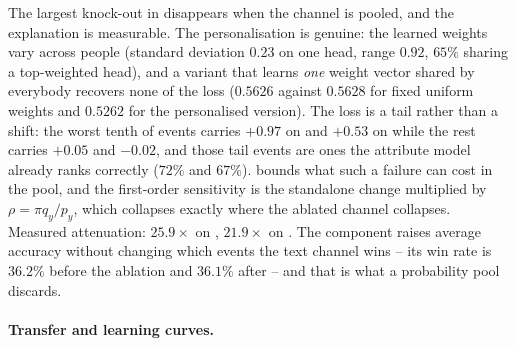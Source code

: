 The largest knock-out in  disappears when the channel is pooled, and the
explanation is measurable. The personalisation is genuine: the learned weights vary across
people (standard deviation $0.23$ on one head, range $0.92$, $65\%$ sharing a top-weighted
head), and a variant that learns \emph{one} weight vector shared by everybody recovers none of
the loss ($0.5626$ against $0.5628$ for fixed uniform weights and $0.5262$ for the personalised
version). The loss is a tail rather than a shift: the worst tenth of events carries $+0.97$ on
 and $+0.53$ on  while the rest carries $+0.05$ and $-0.02$, and
those tail events are ones the attribute model already ranks correctly ($72\%$ and $67\%$).
 bounds what such a failure can cost in the pool, and the first-order sensitivity
is the standalone change multiplied by $\rho = \pi q_y/p_y$, which collapses exactly where the
ablated channel collapses. Measured attenuation: $25.9\times$ on ,
$21.9\times$ on . The component raises average accuracy without changing which
events the text channel wins -- its win rate is $36.2\%$ before the ablation and $36.1\%$ after
-- and that is what a probability pool discards.


\begin{table}[h]
\caption{Fitted mixture weight $\pi$ by channel, respondent-disjoint protocol. A channel with no
text at all attracts the largest weight on every dataset.}
\label{tab:pi}
\centering\small

\end{table}

\begin{table}[h]
\caption{Four proposed improvements against their own controls, ,
respondent-disjoint protocol.}
\label{tab:improvements}
\centering\small

\end{table}

\paragraph{Transfer and learning curves.}

\begin{table}[t]
\caption{Transfer of the axis scorer between datasets (seed 7). The projection and per-axis heads
transfer and are frozen; valuation and calibration are refitted on the target.}
\label{tab:transfer}
\centering\small

\end{table}

